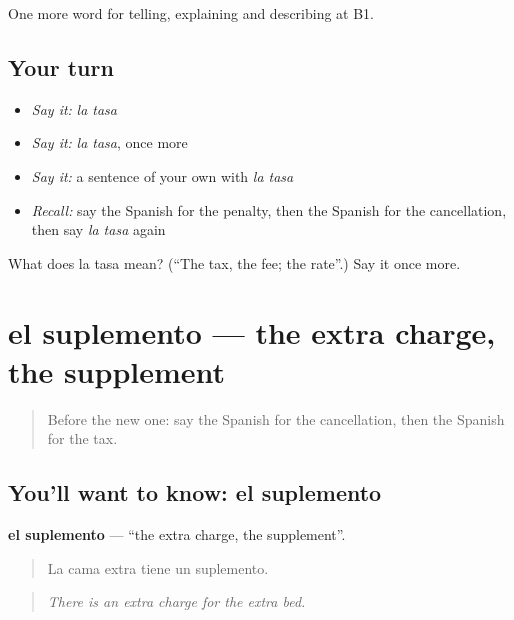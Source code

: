 \begin{grammarlens}[title={What you've built}]
One more word for telling, explaining and describing at B1.
\end{grammarlens}

\subsection*{Your turn}
\begin{itemize}
\raggedright
  \item \emph{Say it:} \emph{la tasa}
  \item \emph{Say it:} \emph{la tasa}, once more
  \item \emph{Say it:} a sentence of your own with \emph{la tasa}
  \item \emph{Recall:} say the Spanish for the penalty, then the Spanish for the cancellation, then say \emph{la tasa} again
\end{itemize}

\begin{tcolorbox}[breakable,colback=teal!4,colframe=teal!35!black,title={Before you move on}]
What does la tasa mean? (\textquotedblleft{}The tax, the fee; the rate\textquotedblright{}.) Say it once more.
\end{tcolorbox}
\section[el suplemento]{el suplemento — the extra charge, the supplement}

\label{lesson:ES-C663-suplemento}



\begin{quote}
Before the new one: say the Spanish for the cancellation, then the Spanish for the tax.
\end{quote}

\subsection*{You'll want to know: el suplemento}
\textbf{el suplemento} — \textquotedblleft{}the extra charge, the supplement\textquotedblright{}.

\begin{quote}
La cama extra tiene un suplemento.
\end{quote}

\begin{quote}
\emph{There is an extra charge for the extra bed.}
\end{quote}

